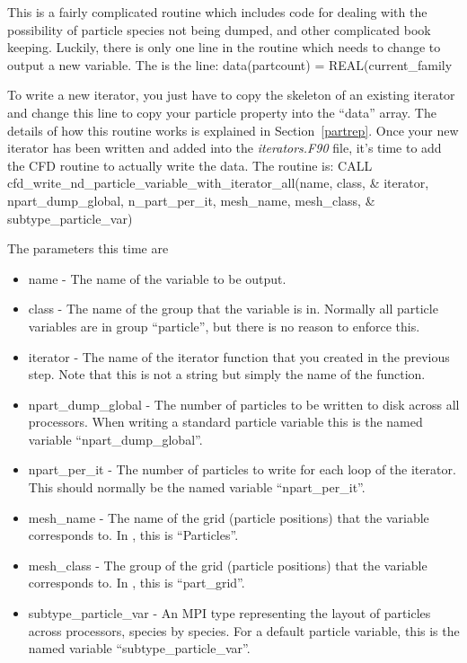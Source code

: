 \documentclass[12pt,a4paper]{article}
\newcommand{\EPOCH}{{\color{warwickdark}\fontfamily{phv}\selectfont{EPOCH}}}
\newenvironment{boxverbatim}{\lboxverbatim{none}}{\endlboxverbatim}
\begin{document}
This is a fairly complicated routine which includes code for dealing with the
possibility of particle species not being dumped, and other complicated
book keeping. Luckily, there is only one line in the routine which needs to
change to output a new variable. The is the line:
\begin{boxverbatim}
  data(partcount) = REAL(current_family%
\end{boxverbatim}

To write a new iterator, you just have to copy the skeleton of an existing
iterator and change this line to copy your particle property into the ``data''
array. The details of how this routine works is explained in Section~\ref{partrep}. Once your new iterator has been written and added into the
{\it iterators.F90} file, it's time to add the CFD routine to actually write
the data. The routine is:
\begin{boxverbatim}
CALL cfd_write_nd_particle_variable_with_iterator_all(name, class, &
    iterator, npart_dump_global, n_part_per_it, mesh_name, mesh_class, &
    subtype_particle_var)
\end{boxverbatim}

The parameters this time are
\begin{itemize}
\item name - The name of the variable to be output.
\item class - The name of the group that the variable is in. Normally all
  {\EPOCH} particle variables are in group ``particle'', but there is no reason
  to enforce this.
\item iterator - The name of the iterator function that you created in
  the previous step. Note that this is not a string but simply the name of the
  function.
\item npart\_dump\_global - The number of particles to be written to disk
  across all processors. When writing a standard particle variable this is the
  named variable ``npart\_dump\_global''.
\item npart\_per\_it - The number of particles to write for each loop of the
  iterator. This should normally be the named variable ``npart\_per\_it''.
\item mesh\_name - The name of the grid (particle positions) that the variable
  corresponds to. In {\EPOCH}, this is ``Particles''.
\item mesh\_class - The group of the grid (particle positions) that the variable
  corresponds to. In {\EPOCH}, this is ``part\_grid''.
\item subtype\_particle\_var - An MPI type representing the layout of particles
  across processors, species by species. For a default particle variable, this
  is the named variable ``subtype\_particle\_var''.
\end{itemize}
\end{document}
